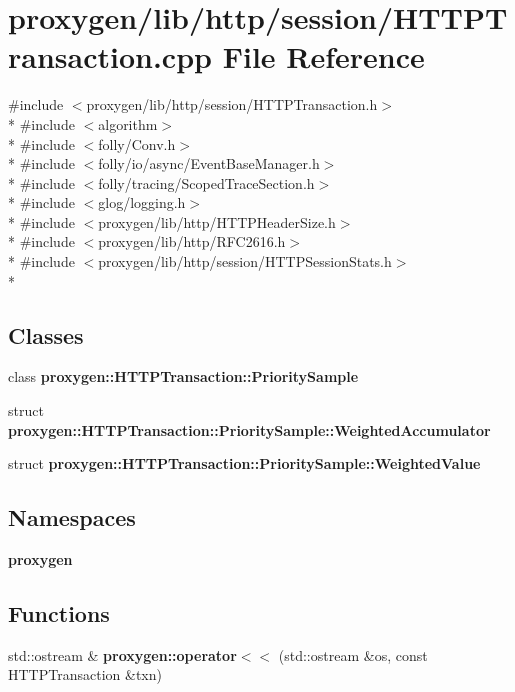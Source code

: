 \section{proxygen/lib/http/session/\+H\+T\+T\+P\+Transaction.cpp File Reference}
\label{HTTPTransaction_8cpp}
{\ttfamily \#include $<$proxygen/lib/http/session/\+H\+T\+T\+P\+Transaction.\+h$>$}\\*
{\ttfamily \#include $<$algorithm$>$}\\*
{\ttfamily \#include $<$folly/\+Conv.\+h$>$}\\*
{\ttfamily \#include $<$folly/io/async/\+Event\+Base\+Manager.\+h$>$}\\*
{\ttfamily \#include $<$folly/tracing/\+Scoped\+Trace\+Section.\+h$>$}\\*
{\ttfamily \#include $<$glog/logging.\+h$>$}\\*
{\ttfamily \#include $<$proxygen/lib/http/\+H\+T\+T\+P\+Header\+Size.\+h$>$}\\*
{\ttfamily \#include $<$proxygen/lib/http/\+R\+F\+C2616.\+h$>$}\\*
{\ttfamily \#include $<$proxygen/lib/http/session/\+H\+T\+T\+P\+Session\+Stats.\+h$>$}\\*
\subsection*{Classes}
\begin{DoxyCompactItemize}
\item 
class {\bf proxygen\+::\+H\+T\+T\+P\+Transaction\+::\+Priority\+Sample}
\item 
struct {\bf proxygen\+::\+H\+T\+T\+P\+Transaction\+::\+Priority\+Sample\+::\+Weighted\+Accumulator}
\item 
struct {\bf proxygen\+::\+H\+T\+T\+P\+Transaction\+::\+Priority\+Sample\+::\+Weighted\+Value}
\end{DoxyCompactItemize}
\subsection*{Namespaces}
\begin{DoxyCompactItemize}
\item 
 {\bf proxygen}
\end{DoxyCompactItemize}
\subsection*{Functions}
\begin{DoxyCompactItemize}
\item 
std\+::ostream \& {\bf proxygen\+::operator$<$$<$} (std\+::ostream \&os, const H\+T\+T\+P\+Transaction \&txn)
\end{DoxyCompactItemize}
